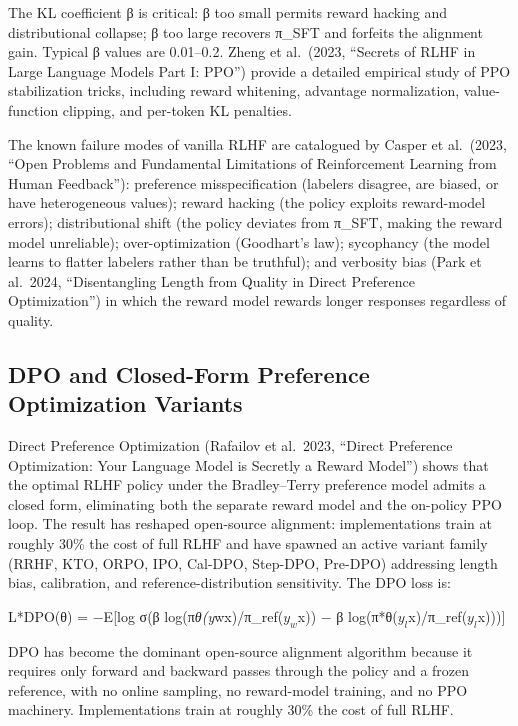The KL coefficient β is critical: β too small permits reward hacking and distributional collapse; β too large recovers π\_SFT and forfeits the alignment gain. Typical β values are 0.01--0.2. Zheng et al.~(2023, ``Secrets of RLHF in Large Language Models Part I: PPO'') provide a detailed empirical study of PPO stabilization tricks, including reward whitening, advantage normalization, value-function clipping, and per-token KL penalties.

The known failure modes of vanilla RLHF are catalogued by Casper et al.~(2023, ``Open Problems and Fundamental Limitations of Reinforcement Learning from Human Feedback''): preference misspecification (labelers disagree, are biased, or have heterogeneous values); reward hacking (the policy exploits reward-model errors); distributional shift (the policy deviates from π\_SFT, making the reward model unreliable); over-optimization (Goodhart's law); sycophancy (the model learns to flatter labelers rather than be truthful); and verbosity bias (Park et al.~2024, ``Disentangling Length from Quality in Direct Preference Optimization'') in which the reward model rewards longer responses regardless of quality.

\subsection{DPO and Closed-Form Preference Optimization Variants}\label{dpo-and-closed-form-preference-optimization-variants}

Direct Preference Optimization (Rafailov et al.~2023, ``Direct Preference Optimization: Your Language Model is Secretly a Reward Model'') shows that the optimal RLHF policy under the Bradley--Terry preference model admits a closed form, eliminating both the separate reward model and the on-policy PPO loop. The result has reshaped open-source alignment: implementations train at roughly 30\% the cost of full RLHF and have spawned an active variant family (RRHF, KTO, ORPO, IPO, Cal-DPO, Step-DPO, Pre-DPO) addressing length bias, calibration, and reference-distribution sensitivity. The DPO loss is:

L*DPO(θ) = −E{[}log σ(β log(π\emph{θ(y}w\textbar x)/π\_ref(\(y_w\)\textbar x)) − β log(π*θ(\(y_l\)\textbar x)/π\_ref(\(y_l\)\textbar x))){]}

DPO has become the dominant open-source alignment algorithm because it requires only forward and backward passes through the policy and a frozen reference, with no online sampling, no reward-model training, and no PPO machinery. Implementations train at roughly 30\% the cost of full RLHF.

